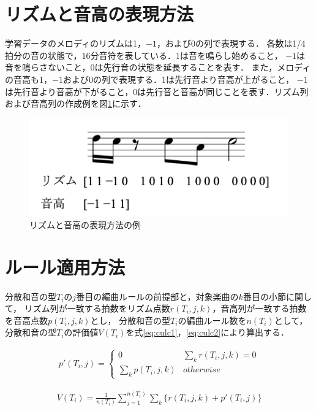 

\section{リズムと音高の表現方法}
学習データのメロディのリズムは1，$-1$，および0の列で表現する．
各数は1/4拍分の音の状態で，16分音符を表している．1は音を鳴らし始めること，
$-1$は音を鳴らさないこと，0は先行音の状態を延長することを表す．
また，メロディの音高も1，$-1$および0の列で表現する．1は先行音より音高が上がること，
$-1$は先行音より音高が下がること，0は先行音と音高が同じことを表す．リズム列および音高列の作成例を図\ref{fig:pitch_rythm}に示す．

\begin{figure}[htb]
  \centering
  \includegraphics[scale=1.0]{image/pitch_rythm.png}
  \caption{リズムと音高の表現方法の例}
  \label{fig:pitch_rythm}
\end{figure}

\newpage

\section{ルール適用方法}
分散和音の型$T_i$の$j$番目の編曲ルールの前提部と，対象楽曲の$k$番目の小節に関して，
リズム列が一致する拍数をリズム点数$r(T_i, j, k)$，音高列が一致する拍数を音高点数$p(T_i, j ,k)$とし，
分散和音の型$T_i$の編曲ルール数を$n(T_i)$として，分散和音の型$T_i$の評価値$V(T_i)$を式\ref{eq:culc1}，\ref{eq:culc2}により算出する．

\begin{eqnarray}
  p'(T_i,j)=\left\{
  \begin{array}{ll}
  0&\sum_{k} r(T_i, j, k)=0\\
  \sum_{k} p(T_i, j ,k)&otherwise
  \end{array}
  \right.
  \label{eq:culc1}
\end{eqnarray}

\begin{eqnarray}
  V(T_i)=\frac{1}{n(T_i)} \sum_{j=1}^{n(T_i)} \sum_{k} \{r(T_i, j, k)+p'(T_i,j)\}
  \label{eq:culc2}
\end{eqnarray}

